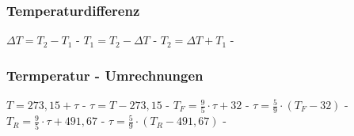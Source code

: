 \subsubsection{Temperaturdifferenz} 
\begin{minipage}{0.45\textwidth} 
\end{minipage} 
\begin{minipage}{0.45\textwidth} 
 
\legende{}\end{minipage} 
 
$ \Delta T = T_{2}  - T_{1} $ - $ T_{1}  = T_{2}  - \Delta T $ - $ T_{2}  = \Delta T + T_{1} $ - \\ 
 
\subsubsection{Termperatur - Umrechnungen} 
\begin{minipage}{0.45\textwidth} 
\end{minipage} 
\begin{minipage}{0.45\textwidth} 
 
\legende{}\end{minipage} 
 
$ T = 273,15 + \tau $ - $ \tau  = T-273,15 $ - $ T_{F}  = \frac{9}{5}\cdot \tau  +32 $ - $ \tau  = \frac{5}{9}\cdot (T_{F}  - 32) $ - $ T_{R}  = \frac{9}{5}\cdot \tau  + 491,67 $ - $ \tau  = \frac{5}{9}\cdot (T_{R}  - 491,67) $ - \\ 
 
